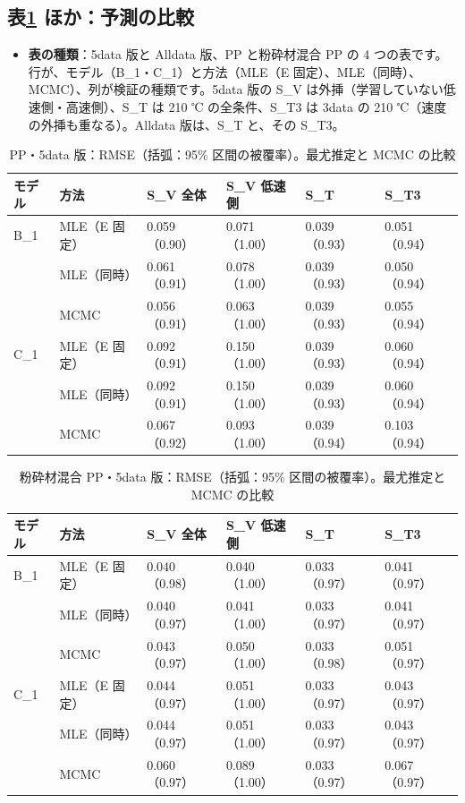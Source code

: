 \documentclass[paper=a4paper,fontsize=10.5pt,line_length=44zw,number_of_lines=38]{jlreq}
\newenvironment{points}{\begin{itemize}[label=$\triangleright$,leftmargin=1.5\zw,itemsep=0.3ex,topsep=0.5ex,parsep=0pt]}{\end{itemize}}
\newcommand{\pt}[1]{\item \textbf{#1}：}
\begin{document}
\subsection{表\ref{tab:met_5data_PP} ほか：予測の比較}
\begin{points}
\pt{表の種類}5data 版と Alldata 版、PP と粉砕材混合 PP の 4 つの表です。行が、モデル（B\_1・C\_1）と方法（MLE（E 固定）、MLE（同時）、MCMC）、列が検証の種類です。5data 版の S\_V は外挿（学習していない低速側・高速側）、S\_T は 210 ℃ の全条件、S\_T3 は 3data の 210 ℃（速度の外挿も重なる）。Alldata 版は、S\_T と、その S\_T3。
\end{points}
\begin{table}[H]
\caption{PP・5data 版：RMSE（括弧：95\% 区間の被覆率）。最尤推定と MCMC の比較}\label{tab:met_5data_PP}
\small
\begin{tabularx}{\linewidth}{@{}llXXXX@{}}
\toprule
モデル & 方法 & S\_V 全体 & S\_V 低速側 & S\_T & S\_T3 \\
\midrule
B\_1 & MLE（E 固定） & 0.059（0.90） & 0.071（1.00） & 0.039（0.93） & 0.051（0.94） \\
 & MLE（同時） & 0.061（0.91） & 0.078（1.00） & 0.039（0.93） & 0.050（0.94） \\
 & MCMC & 0.056（0.91） & 0.063（1.00） & 0.039（0.93） & 0.055（0.94） \\
\midrule
C\_1 & MLE（E 固定） & 0.092（0.91） & 0.150（1.00） & 0.039（0.93） & 0.060（0.94） \\
 & MLE（同時） & 0.092（0.91） & 0.150（1.00） & 0.039（0.93） & 0.060（0.94） \\
 & MCMC & 0.067（0.92） & 0.093（1.00） & 0.039（0.94） & 0.103（0.94） \\

\bottomrule
\end{tabularx}
\end{table}

\begin{table}[H]
\caption{粉砕材混合 PP・5data 版：RMSE（括弧：95\% 区間の被覆率）。最尤推定と MCMC の比較}\label{tab:met_5data_MIX}
\small
\begin{tabularx}{\linewidth}{@{}llXXXX@{}}
\toprule
モデル & 方法 & S\_V 全体 & S\_V 低速側 & S\_T & S\_T3 \\
\midrule
B\_1 & MLE（E 固定） & 0.040（0.98） & 0.040（1.00） & 0.033（0.97） & 0.041（0.97） \\
 & MLE（同時） & 0.040（0.97） & 0.041（1.00） & 0.033（0.97） & 0.041（0.97） \\
 & MCMC & 0.043（0.97） & 0.050（1.00） & 0.033（0.98） & 0.051（0.97） \\
\midrule
C\_1 & MLE（E 固定） & 0.044（0.97） & 0.051（1.00） & 0.033（0.97） & 0.043（0.97） \\
 & MLE（同時） & 0.044（0.97） & 0.051（1.00） & 0.033（0.97） & 0.043（0.97） \\
 & MCMC & 0.060（0.97） & 0.089（1.00） & 0.033（0.97） & 0.067（0.97） \\

\bottomrule
\end{tabularx}
\end{table}
\end{document}

